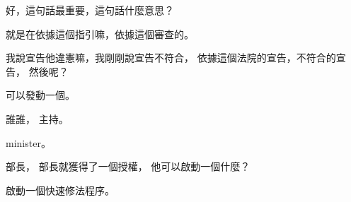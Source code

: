 \hypertarget{w06:cue:862}{}好，這句話最重要，這句話什麼意思？

\hypertarget{w06:cue:863}{}就是在依據這個指引嘛，依據這個審查的。

\hypertarget{w06:cue:864}{}我說宣告他違憲嘛，我剛剛說宣告不符合，
\hypertarget{w06:cue:865}{}依據這個法院的宣告，不符合的宣告，
\hypertarget{w06:cue:866}{}然後呢？

\hypertarget{w06:cue:867}{}可以發動一個。

\hypertarget{w06:cue:868}{}誰誰，
\hypertarget{w06:cue:869}{}主持。

\hypertarget{w06:cue:870}{}minister。

\hypertarget{w06:cue:871}{}部長，
\hypertarget{w06:cue:872}{}部長就獲得了一個授權，
\hypertarget{w06:cue:873}{}他可以啟動一個什麼？

\hypertarget{w06:cue:874}{}啟動一個快速修法程序。

